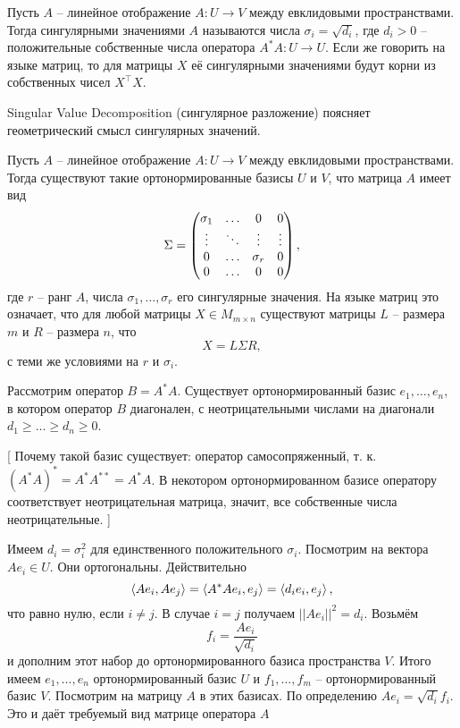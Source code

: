 \endproof
\ethrm


 Пусть $A$ -- линейное отображение $A\colon U \to V$ между евклидовыми пространствами. Тогда сингулярными значениями $A$ называются числа $\sigma_i=\sqrt{d_i}$, где $d_i>0$ -- положительные собственные числа оператора $A^*A \colon U \to U$. Если же говорить на языке матриц, то для матрицы $X$ её сингулярными значениями будут корни из собственных чисел $X^{\top}X$. 
\edfn

Singular Value Decomposition (сингулярное разложение) поясняет геометрический смысл сингулярных значений.

 Пусть $A$ -- линейное отображение $A\colon U \to V$ между евклидовыми пространствами. Тогда существуют такие ортонормированные базисы $U$ и $V$, что матрица $A$ имеет вид 
$$\Sigma = \begin{pmatrix} \sigma_1 &\dots& 0 & 0\\
 \vdots & \ddots &\vdots & \vdots\\
 0 & \dots & \sigma_r & 0\\
 0 &  \dots & 0 & 0 \end{pmatrix},$$
 где $r$ -- ранг $A$, числа $\sigma_1, \dots, \sigma_r$ его сингулярные значения.
На языке матриц это означает, что для любой матрицы $X \in M_{m\times n}$ существуют матрицы $L$ -- размера $m$ и $R$ -- размера $n$,  что
$$X= L \Sigma R,$$
 с теми же условиями на $r$ и $\sigma_i$.
 
\proof Рассмотрим оператор $B = A^{*}A$. Существует ортонормированный базис $e_1,\dots,e_n$, в котором оператор $B$ диагонален, с неотрицательными числами на диагонали $d_1\geq\dots\geq d_n\geq 0$. 

[ Почему такой базис существует: оператор самосопряженный, т. к. $(A^*A)^* = A^*A^{**} = A^*A$. В некотором ортонормированном базисе оператору соответствует неотрицательная матрица, значит, все собственные числа неотрицательные. ]

Имеем  $d_i=\sigma_i^2$ для единственного положительного $\sigma_i$. 
Посмотрим на вектора $Ae_i \in U$. Они ортогональны. Действительно
$$\left\langle Ae_i, Ae_j\right\rangle = \left\langle A^{*}Ae_i,e_j \right\rangle = \left\langle d_i e_i,e_j\right\rangle,$$
что равно нулю, если $i\neq j$. В случае $i=j$ получаем $||Ae_i||^2=d_i$. Возьмём 
$$f_i=\frac{Ae_i}{\sqrt{d_i}}$$
и дополним этот набор до ортонормированного базиса пространства $V$. Итого имеем $e_1,\dots,e_n$ ортонормированный базис $U$ и $f_1,\dots,f_m$ -- ортонормированный базис $V$.
Посмотрим на матрицу $A$ в этих базисах. По определению $Ae_i=\sqrt{d_i}f_i$. Это и даёт требуемый вид матрице оператора $A$

